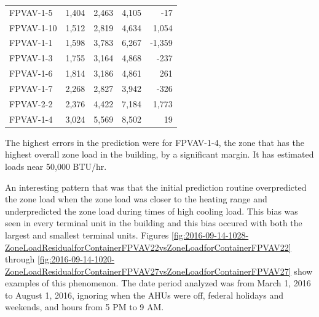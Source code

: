 \begin{table}[]
\begin{tabular}{lrrrr}
FPVAV-1-5 & 1,404 & 2,463 & 4,105 & -17 \\ 
FPVAV-1-10 & 1,512 & 2,819 & 4,634 & 1,054 \\ 
FPVAV-1-1 & 1,598 & 3,783 & 6,267 & -1,359 \\ 
FPVAV-1-3 & 1,755 & 3,164 & 4,868 & -237 \\ 
FPVAV-1-6 & 1,814 & 3,186 & 4,861 & 261 \\ 
FPVAV-1-7 & 2,268 & 2,827 & 3,942 & -326 \\ 
FPVAV-2-2 & 2,376 & 4,422 & 7,184 & 1,773 \\ 
FPVAV-1-4 & 3,024 & 5,569 & 8,502 & 19 \\ 
    \bottomrule
\end{tabular}
\end{table}

The highest errors in the prediction were for FPVAV-1-4, the zone that has the highest overall zone load in the building, by a significant margin. It has estimated loads near 50,000 BTU/hr.



An interesting pattern that was that the initial prediction routine overpredicted the zone load when the zone load was closer to the heating range and underpredicted the zone load during times of high cooling load. This bias was seen in every terminal unit in the building and this bias occured with both the largest and smallest terminal units. Figures \ref{fig:2016-09-14-1028-ZoneLoadResidualforContainerFPVAV22vsZoneLoadforContainerFPVAV22} through \ref{fig:2016-09-14-1020-ZoneLoadResidualforContainerFPVAV27vsZoneLoadforContainerFPVAV27} show examples of this phenomenon. The date period analyzed was from March 1, 2016 to August 1, 2016, ignoring when the AHUs were off, federal holidays and weekends, and hours from 5 PM to 9 AM. 

\newcommand{\zoneLoadCaption}[1]{Bias in zone load prediction for #1.}

